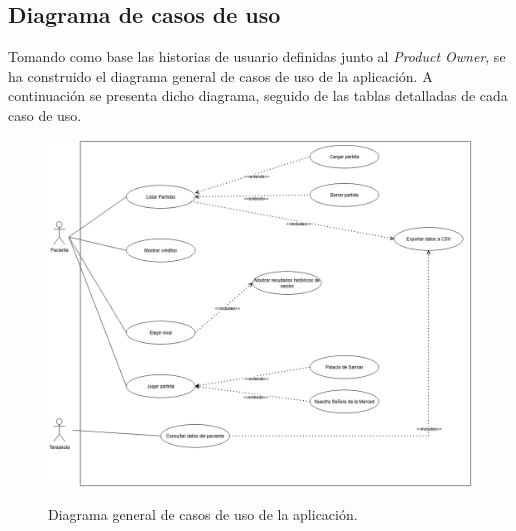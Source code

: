 \subsection{Diagrama de casos de uso}
Tomando como base las historias de usuario definidas junto al \textit{Product Owner}, se ha construido el diagrama general de casos de uso de la aplicación. A continuación se presenta dicho diagrama, seguido de las tablas detalladas de cada caso de uso.
\begin{figure}[h]
	\caption[Diagrama: casos de uso]{Diagrama general de casos de uso de la aplicación.}
	\centering
	\includegraphics[width=\textwidth, keepaspectratio]{../img/anexos/diagramacasodeuso.png}
	\label{b:diagrama-cu}
\end{figure}

